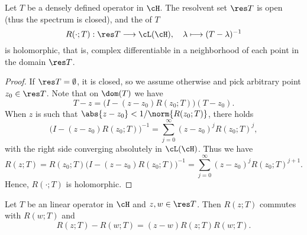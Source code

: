 \documentclass[oneside,reqno,letterpaper]{amsart}
\begin{document}
\begin{theorem}
\label{thm:resolvent-properties}
  Let \(T\) be a densely defined operator in \(\cH\). 
  The resolvent set \(\res T\) is open (thus the spectrum is closed), and the  of \(T\)
  \[
    R(\cdot; T): \res T \longrightarrow \cL(\cH), \quad \lambda \longmapsto (T - \lambda)^{-1}
  \] 
  is holomorphic, that is, complex differentiable in a neighborhood of each point in the domain \(\res T\). 
\end{theorem}
\begin{proof}
  If \(\res T = \emptyset\), it is closed, so we assume otherwise and pick arbitrary point  \(z_0 \in \res T\). 
  Note that on \(\dom(T)\) we have 
  \[
    T - z = \Big( I - (z - z_0) R(z_0; T) \Big) (T - z_0) . 
  \] 
  When \(z\) is such that \(\abs{z - z_0} < 1 / \norm{R(z_0; T)}\), there holds
  \[
    \big( I - (z - z_0) R(z_0; T) \big)^{-1} = \sum_{j = 0}^{\infty} (z - z_0)^j R(z_0; T)^j , 
  \] 
  with the right side converging absolutely in \(\cL(\cH)\).
  Thus we have 
  \[
    R(z; T) 
    = R(z_0; T) \big( I - (z - z_0) R(z_0; T) \big)^{-1} 
    = \sum_{j = 0}^{\infty} (z - z_0)^j R(z_0; T)^{j + 1} . 
  \] 
  Hence, \(R(\cdot; T)\) is holomorphic.
\end{proof}


\begin{theorem}
\label{thm:resolvent-identities}
  Let \(T\) be an linear operator in \(\cH\) and \(z, w \in \res T\). 
  Then \(R(z; T)\) commutes with \(R(w; T)\) and 
  \[
    R(z; T) - R(w; T) = (z - w) R(z; T) R(w; T) . 
  \] 
\end{theorem}
\end{document}
